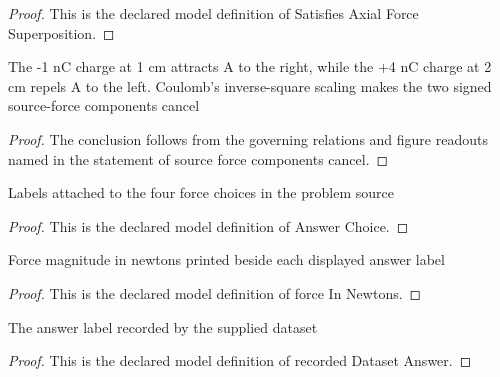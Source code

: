 \begin{proof}
  This is the declared model definition of Satisfies Axial Force Superposition.
\end{proof}
\begin{lemma}
  \label{lem:physics:phyx-mini-0892:phyxminiproblems-problemphyxmini0892-source-force-components-cancel}
  The -1 nC charge at 1 cm attracts A to the right, while the +4 nC charge at 2 cm repels A to the left. Coulomb's inverse-square scaling makes the two signed source-force components cancel
\end{lemma}
\begin{proof}
  The conclusion follows from the governing relations and figure readouts named in the statement of source force components cancel.
\end{proof}
\begin{definition}
  \label{def:physics:phyx-mini-0892:phyxminiproblems-problemphyxmini0892-answerchoice}
  Labels attached to the four force choices in the problem source
\end{definition}
\begin{proof}
  This is the declared model definition of Answer Choice.
\end{proof}
\begin{definition}
  \label{def:physics:phyx-mini-0892:phyxminiproblems-problemphyxmini0892-answerchoice-forceinnewtons}
  Force magnitude in newtons printed beside each displayed answer label
\end{definition}
\begin{proof}
  This is the declared model definition of force In Newtons.
\end{proof}
\begin{definition}
  \label{def:physics:phyx-mini-0892:phyxminiproblems-problemphyxmini0892-recordeddatasetanswer}
  The answer label recorded by the supplied dataset
\end{definition}
\begin{proof}
  This is the declared model definition of recorded Dataset Answer.
\end{proof}
